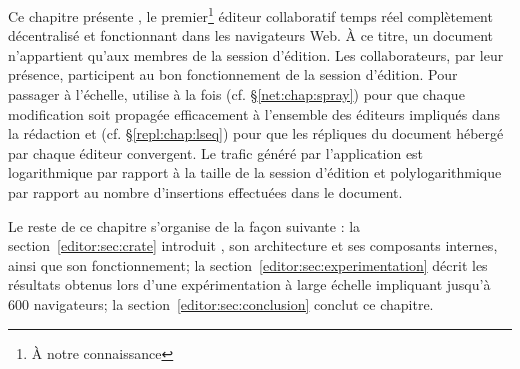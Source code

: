 



Ce chapitre présente \CRATE, le premier\footnote{À notre connaissance} éditeur
collaboratif temps réel complètement décentralisé et fonctionnant dans les
navigateurs Web. À ce titre, un document n'appartient qu'aux membres de la
session d'édition. Les collaborateurs, par leur présence, participent au bon
fonctionnement de la session d'édition. Pour passager à l'échelle, \CRATE
utilise à la fois \SPRAY (cf. §\ref{net:chap:spray}) pour que chaque
modification soit propagée efficacement à l'ensemble des éditeurs impliqués dans
la rédaction et \LSEQ (cf. §\ref{repl:chap:lseq}) pour que les répliques du
document hébergé par chaque éditeur convergent. Le trafic généré par
l'application est logarithmique par rapport à la taille de la session d'édition
et polylogarithmique par rapport au nombre d'insertions effectuées dans le
document.

Le reste de ce chapitre s'organise de la façon suivante : 
la section~\ref{editor:sec:crate} introduit \CRATE, son architecture et ses
composants internes, ainsi que son fonctionnement; la
section~\ref{editor:sec:experimentation} décrit les résultats obtenus lors d'une
expérimentation à large échelle impliquant jusqu'à 600 navigateurs; la
section~\ref{editor:sec:conclusion} conclut ce chapitre.


